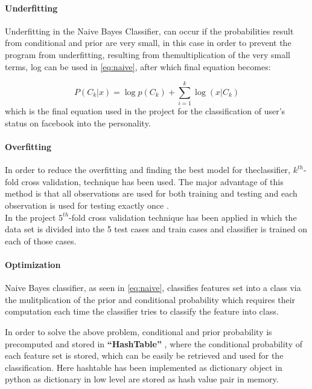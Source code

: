\paragraph{Underfitting}\hfill

Underfitting \cite{naive} in the Naive Bayes Classifier, can occur if the probabilities result from conditional and prior are very small, in this case in order to prevent the program from underfitting, resulting from themultiplication of the very small terms, log can be used in \ref{eq:naive}, after which final equation becomes:

\begin{equation}
P(C_k|x) = \log p(C_k) + \sum_{i=1}^{k} \log(x|C_k) 
\end{equation}
which is the final equation used in the project for the classification of user's status on facebook into the personality.

\paragraph{Overfitting}\hfill

In order to reduce the overfitting and finding the best model for theclassifier, $k^{th}$-fold cross validation, technique has been used. The major advantage of this method is that all observations are used for both training and testing and each observation is used for testing exactly once \cite{cross}. \\
In the project $5^{th}$-fold cross validation technique has been applied in which the data set is divided into the 5 test cases and train cases and classifier is trained on each of those cases.

\paragraph{Optimization}\hfill

Naive Bayes classifier, as seen in \ref{eq:naive}, classifies features set into a class via the mulitplication of the prior and conditional probability which requires their computation each time the classifier tries to classify the feature into class.

In order to solve the above problem, conditional and prior probability is precomputed and stored in \textbf{``HashTable''} \cite{naive}, where the conditional probability of each feature set is stored, which can be easily be retrieved and used for the classification. Here hashtable has been implemented as dictionary object in python as dictionary in low level are stored as hash value pair in memory.

